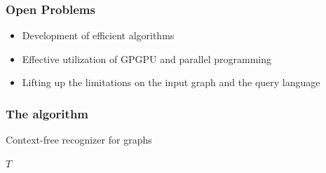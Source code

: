 \documentclass[xcolor=table]{beamer}
\begin{document}

\begin{frame}
  \transwipe[direction=90]
  \frametitle{Open Problems}
  \begin{itemize}
    \item Development of efficient algorithms
    \item Effective utilization of GPGPU and parallel programming
    \item Lifting up the limitations on the input graph and the query language
  \end{itemize}
\end{frame}

\begin{frame}
  \transwipe[direction=90]
  \frametitle{The algorithm}

\begin{algorithm}[H]
\begin{algorithmic}[1]
\caption{Context-free recognizer for graphs}
\label{alg:graphParse}
    
    \EndFor    
       
    \EndWhile
\State \Return $T$
\EndFunction
\end{algorithmic}
\end{algorithm}

\end{frame}
\end{document}
